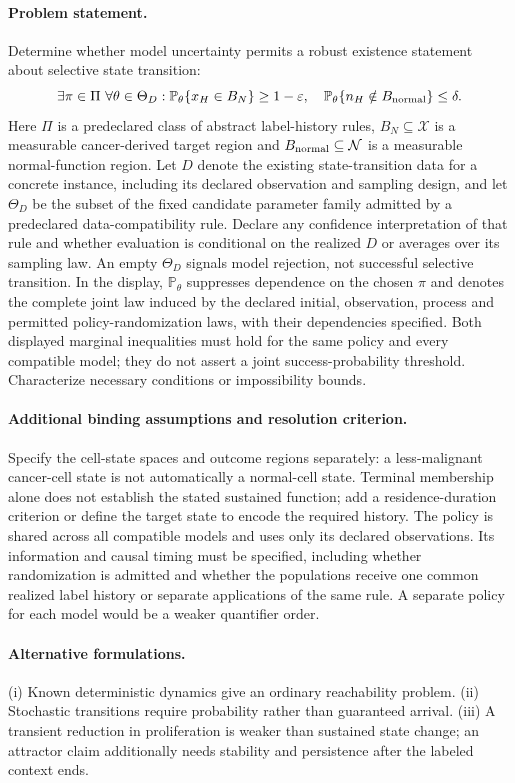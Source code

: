 \documentclass[11pt]{article}
\begin{document}
\paragraph{Problem statement.} Determine whether model uncertainty permits a robust existence statement about selective state transition:
    \[\exists\pi\in\Pi\ \forall\theta\in\Theta_D:
    \mathbb{P}_\theta\{x_H\in B_N\}\geq1-\varepsilon,
    \quad \mathbb{P}_\theta\{n_H\notin B_{\rm normal}\}\leq\delta.\]
    Here $\Pi$ is a predeclared class of abstract label-history rules, $B_N\subseteq\mathcal X$ is a measurable cancer-derived target region and $B_{\rm normal}\subseteq\mathcal N$ is a measurable normal-function region. Let $D$ denote the existing state-transition data for a concrete instance, including its declared observation and sampling design, and let $\Theta_D$ be the subset of the fixed candidate parameter family admitted by a predeclared data-compatibility rule. Declare any confidence interpretation of that rule and whether evaluation is conditional on the realized $D$ or averages over its sampling law. An empty $\Theta_D$ signals model rejection, not successful selective transition. In the display, $\mathbb P_\theta$ suppresses dependence on the chosen $\pi$ and denotes the complete joint law induced by the declared initial, observation, process and permitted policy-randomization laws, with their dependencies specified. Both displayed marginal inequalities must hold for the same policy and every compatible model; they do not assert a joint success-probability threshold. Characterize necessary conditions or impossibility bounds.
\paragraph{Additional binding assumptions and resolution criterion.} Specify the cell-state spaces and outcome regions separately: a less-malignant cancer-cell state is not automatically a normal-cell state. Terminal membership alone does not establish the stated sustained function; add a residence-duration criterion or define the target state to encode the required history. The policy is shared across all compatible models and uses only its declared observations. Its information and causal timing must be specified, including whether randomization is admitted and whether the populations receive one common realized label history or separate applications of the same rule. A separate policy for each model would be a weaker quantifier order.

\paragraph{Alternative formulations.} (i) Known deterministic dynamics give an ordinary reachability problem. (ii) Stochastic transitions require probability rather than guaranteed arrival. (iii) A transient reduction in proliferation is weaker than sustained state change; an attractor claim additionally needs stability and persistence after the labeled context ends.
\end{document}
